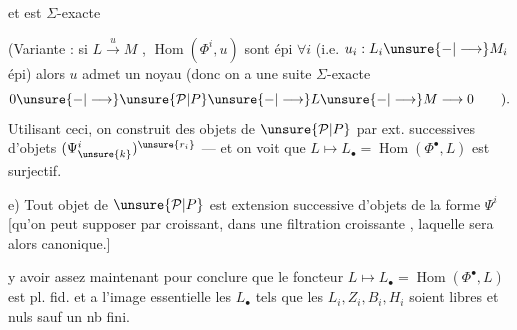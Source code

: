 et est $\Sigma$-exacte

(Variante : si $L\xrightarrow{u}M$ ,
$\operatorname{Hom}(\Phi^i,u)$ sont épi $\forall i$ (i.e. $u_i:L_i\unsure{-|\longrightarrow}M_i$
épi) alors $u$  admet un noyau
(donc on a une suite $\Sigma$-exacte
\[
0\unsure{-|\longrightarrow}\unsure{\mathcal P|P}\unsure{-|\longrightarrow}L\unsure{-|\longrightarrow}M\longrightarrow0\qquad).
\]
Utilisant ceci, on construit des objets
de $\unsure{\mathcal P|P}$ par ext. successives d'objets
$(\Psi_{\unsure{k}}^i)^{\unsure{r_i}}$ --- et on voit que $L\longmapsto L_\bullet=
\operatorname{Hom}(\Phi^\bullet,L)$ est  surjectif.

e) Tout objet de $\unsure{\mathcal P|P}$ est extension successive
d'objets de la forme $\Psi^i$ [qu'on peut
supposer  par  croissant, dans
une filtration croissante ,
laquelle sera alors canonique.]

 y avoir assez maintenant
pour conclure que le foncteur
$L\longmapsto L_\bullet=\operatorname{Hom}(\Phi^\bullet,L)$ est pl. fid. et
a l'image essentielle les $L_\bullet$ tels
que les $L_i,Z_i,B_i,H_i$ soient libres 
et  nuls sauf un nb fini.

